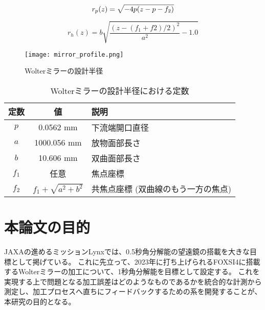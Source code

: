 \begin{equation}
    r_p(z) = \sqrt{ -4p(z - p - f_2) } \\
\end{equation}

\begin{equation}
    r_h(z) = b \sqrt{ \frac{(z - (f_1 + f2) / 2)^2}{a^2} - 1.0 }
\end{equation}

\begin{figure}[h]
\centering
\texttt{[image: mirror\_profile.png]}
\caption{Wolterミラーの設計半径}
\label{fig:wolter_profile}
\end{figure}

\begin{table}[htb]
    \begin{center}
      \begin{tabular}{|c|c|l|} \hline
        定数 & 値 & 説明 \\ \hline
        $p$ & 0.0562 mm & 下流端開口直径 \\
        $a$ & 1000.056 mm & 放物面部長さ \\
        $b$ & 10.606 mm & 双曲面部長さ \\ 
        $f_1$ & 任意 & 焦点座標 \\
        $f_2$ & $f_1 + \sqrt{ a^2 + b^2 }$  & 共焦点座標 (双曲線のもう一方の焦点) \\\hline
      \end{tabular}
      \caption{Wolterミラーの設計半径における定数}
      \label{tb:wolter_profile_constants}
    \end{center}
\end{table}


\clearpage
\newpage
\section{本論文の目的}
\label{chap1_purpose}

JAXAの進めるミッションLynxでは、0.5秒角分解能の望遠鏡の搭載を大きな目標として掲げている。\cite{Gaskin2019}
これに先立って、2023年に打ち上げられるFOXSI4に搭載するWolterミラーの加工について、1秒角分解能を目標として設定する。
これを実現する上で問題となる加工誤差はどのようなものであるかを統合的な計測から測定し、加工プロセスへ直ちにフィードバックするための系を開発することが、本研究の目的となる。

